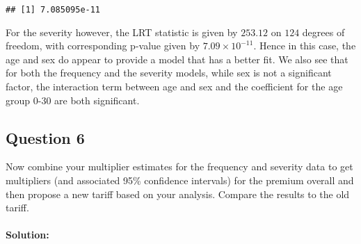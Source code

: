 \documentclass[
]{article}
\begin{document}
\begin{verbatim}
## [1] 7.085095e-11
\end{verbatim}

For the severity however, the LRT statistic is given by \(253.12\) on
\(124\) degrees of freedom, with corresponding p-value given by
\(7.09 \times 10^{−11}\). Hence in this case, the age and sex do appear
to provide a model that has a better fit. We also see that for both the
frequency and the severity models, while sex is not a significant
factor, the interaction term between age and sex and the coefficient for
the age group 0-30 are both significant.

\hypertarget{question-6}{%
\subsection{Question 6}\label{question-6}}

Now combine your multiplier estimates for the frequency and severity
data to get multipliers (and associated 95\% confidence intervals) for
the premium overall and then propose a new tariff based on your
analysis. Compare the results to the old tariff.

\hypertarget{solution-5}{%
\paragraph{Solution:}\label{solution-5}}
\end{document}
